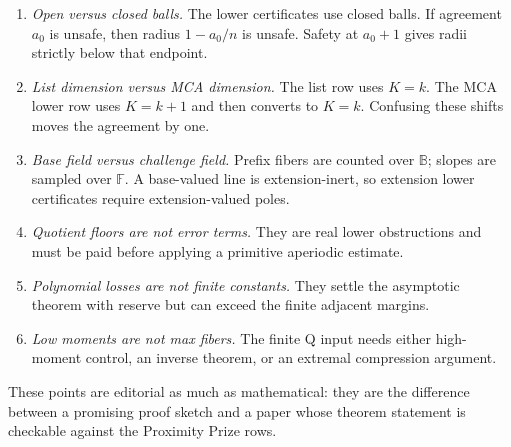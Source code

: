 \documentclass[11pt]{article}
\theoremstyle{definition}
\theoremstyle{remark}
\newcommand{\F}{\mathbb F}
\newcommand{\BB}{\mathbb B}
\begin{document}
\begin{enumerate}[label=\arabic*.,leftmargin=2.1em]
\item \emph{Open versus closed balls.}  The lower certificates use closed balls.  If agreement \(a_0\) is unsafe, then radius \(1-a_0/n\) is unsafe.  Safety at \(a_0+1\) gives radii strictly below that endpoint.
\item \emph{List dimension versus MCA dimension.}  The list row uses \(K=k\).  The MCA lower row uses \(K=k+1\) and then converts to \(K=k\).  Confusing these shifts moves the agreement by one.
\item \emph{Base field versus challenge field.}  Prefix fibers are counted over \(\BB\); slopes are sampled over \(\F\).  A base-valued line is extension-inert, so extension lower certificates require extension-valued poles.
\item \emph{Quotient floors are not error terms.}  They are real lower obstructions and must be paid before applying a primitive aperiodic estimate.
\item \emph{Polynomial losses are not finite constants.}  They settle the asymptotic theorem with reserve but can exceed the finite adjacent margins.
\item \emph{Low moments are not max fibers.}  The finite Q input needs either high-moment control, an inverse theorem, or an extremal compression argument.
\end{enumerate}

These points are editorial as much as mathematical: they are the difference between a promising proof sketch and a paper whose theorem statement is checkable against the Proximity Prize rows.
\end{document}
